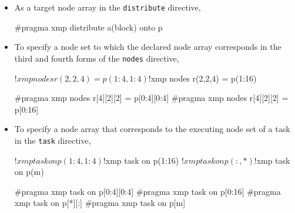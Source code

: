 \begin{itemize}
\item As a target node array in the {\tt distribute} directive,\\

\begin{minipage}{0.43\hsize}
\begin{center}
\end{center}
\end{minipage}
%
\begin{minipage}{0.54\hsize}
\begin{center}
\begin{XCexampleR}
#pragma xmp distribute a(block) onto p
\end{XCexampleR}
\end{center}
\end{minipage}

\item To specify a node set to which the declared node array corresponds
      in the third and fourth forms of the {\tt nodes} directive,\\

\begin{minipage}{0.43\hsize}
\begin{center}
\begin{XFexample}
!$xmp nodes r(2,2,4) = p(1:4,1:4)
!$xmp nodes r(2,2,4) = p(1:16)
\end{XFexample}
\end{center}
\end{minipage}
%
\begin{minipage}{0.54\hsize}
\begin{center}
\begin{XCexampleR}
#pragma xmp nodes r[4][2][2] = p[0:4][0:4]
#pragma xmp nodes r[4][2][2] = p[0:16]
\end{XCexampleR}
\end{center}
\end{minipage}

\item To specify a node array that corresponds to the executing node set
      of a task in the {\tt task} directive,

\begin{minipage}{0.43\hsize}
\begin{center}
\begin{XFexample}
!$xmp task on p(1:4,1:4)
!$xmp task on p(1:16)
!$xmp task on p(:,*)
!$xmp task on p(m)
\end{XFexample}
\end{center}
\end{minipage}
%
\begin{minipage}{0.54\hsize}
\begin{center}
\begin{XCexampleR}
#pragma xmp task on p[0:4][0:4]
#pragma xmp task on p[0:16]
#pragma xmp task on p[*][:]
#pragma xmp task on p[m]
\end{XCexampleR}
\end{center}
\end{minipage}


\end{itemize}

